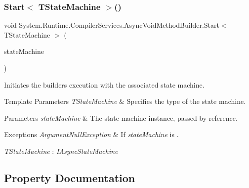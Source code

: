 \subsubsection{\texorpdfstring{Start$<$ T\+State\+Machine $>$()}{Start< TStateMachine >()}}
{\footnotesize\ttfamily void System.\+Runtime.\+Compiler\+Services.\+Async\+Void\+Method\+Builder.\+Start$<$ T\+State\+Machine $>$ (\begin{DoxyParamCaption}\item[{ref T\+State\+Machine}]{state\+Machine }\end{DoxyParamCaption})\hspace{0.3cm}{\ttfamily [inline]}}



Initiates the builder\textquotesingle{}s execution with the associated state machine.


\begin{DoxyTemplParams}{Template Parameters}
{\em T\+State\+Machine} & Specifies the type of the state machine.\\
\hline
\end{DoxyTemplParams}

\begin{DoxyParams}{Parameters}
{\em state\+Machine} & The state machine instance, passed by reference.\\
\hline
\end{DoxyParams}

\begin{DoxyExceptions}{Exceptions}
{\em Argument\+Null\+Exception} & If {\itshape state\+Machine}  is . \\
\hline
\end{DoxyExceptions}
\begin{Desc}
\item[Type Constraints]\begin{description}
\item[{\em T\+State\+Machine} : {\em I\+Async\+State\+Machine}]\end{description}
\end{Desc}


\subsection{Property Documentation}
\mbox{\label{struct_system_1_1_runtime_1_1_compiler_services_1_1_async_void_method_builder_a747b2a2fc6e09e415117f6610c5b9f21}} 
